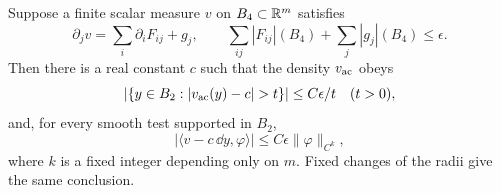 \begin{lemma}\label{lt:potential}
Suppose a finite scalar measure $v$ on $B_4\subset\mathbb R^m$ satisfies
\begin{equation}\label{eq:lt-gradient-equation}
 \partial_jv=\sum_i\partial_i F_{ij}+g_j,
 \qquad \sum_{ij}|F_{ij}|(B_4)+\sum_j|g_j|(B_4)\le\epsilon.
\end{equation}
Then there is a real constant $c$ such that the density $v_{\rm ac}$ obeys
\begin{equation}\label{eq:lt-weak-one}
 |\{y\in B_2:|v_{\rm ac}(y)-c|>t\}|
                     \le C\epsilon/t\quad(t>0),
\end{equation}
and, for every smooth test supported in $B_2$,
\begin{equation}\label{eq:lt-distribution-control}
 |\langle v-c\,\dd y,\varphi\rangle|
                     \le C\epsilon\|\varphi\|_{C^{k}},
\end{equation}
where $k$ is a fixed integer depending only on $m$.  Fixed changes of the
radii give the same conclusion.
\end{lemma}

